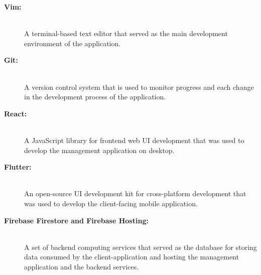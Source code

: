 \documentclass[journal]{./IEEE/IEEEtran}
\begin{document}
\begin{description}
    \item[\textbf{Vim:}] \hfill \\
        A terminal-based text editor that served as the main development environment of the application.


    \item[\textbf{Git:}] \hfill \\
        A version control system that is used to monitor progress and each change in the development process of the application.

    \item[\textbf{React:}] \hfill \\
        A JavaScript library for frontend web UI development that was used to develop the management application on desktop. 

    \item[\textbf{Flutter:}] \hfill \\
        An open-source UI development kit for cross-platform development that was used to develop the client-facing mobile application.
    



\item[\textbf{Firebase Firestore and Firebase Hosting:}] \hfill \\
    A set of backend computing services that served as the database for storing data consumed by the client-application and hosting the management application and the backend services.


\end{description}
\end{document}
